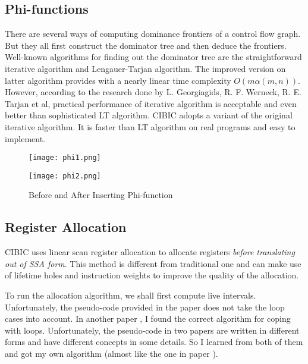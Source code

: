 \documentclass[10pt, a4paper]{article}
\begin{document}
\subsection{Phi-functions}
There are several ways of computing dominance frontiers of a control flow
graph.  But they all first construct the dominator tree and then deduce the
frontiers.  Well-known algorithms for finding out the dominator tree are the
straightforward iterative algorithm and Lengauer-Tarjan algorithm. The improved
version on latter algorithm provides with a nearly linear time complexity $O(m
\alpha(m, n))$. However, according to the research \cite{tarjan06} done by L.
Georgiagids, R.  F. Werneck, R. E. Tarjan et al, practical performance of
iterative algorithm is acceptable and even better than sophisticated LT
algorithm. CIBIC adopts a variant \cite{cooper01} of the original iterative
algorithm. It is faster than LT algorithm on real programs and easy to
implement.
\begin{figure}
    \centering
    \begin{minipage}{0.4\textwidth}
        \texttt{[image: phi1.png]}
    \end{minipage}
    \begin{minipage}{0.4\textwidth}
        \texttt{[image: phi2.png]}
    \end{minipage}
    \caption{Before and After Inserting Phi-function}
    \label{fig:phi_function}
\end{figure}
\subsection{Register Allocation}
CIBIC uses linear scan register allocation \cite{moe02} to allocate registers \emph{before
translating out of SSA form}. This method is different from traditional one and
can make use of lifetime holes and instruction weights to improve the quality of
the allocation.

To run the allocation algorithm, we shall first compute live intervals.
Unfortunately, the pseudo-code provided in the paper \cite{moe02} does not take
the loop cases into account. In another paper \cite{wimmer10}, I found the
correct algorithm for coping with loops. Unfortunately, the pseudo-code in two
papers are written in different forms and have different concepts in some
details. So I learned from both of them and got my own algorithm (almost like
the one in paper \cite{moe02}).
\end{document}
